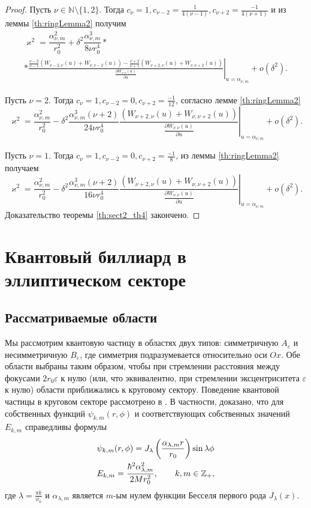 \begin{proof}
Пусть $\nu \in \mathbb{N} \setminus \{1, 2\}$. Тогда $c_\nu=1,
	c_{\nu-2} = \frac{1}{4(\nu-1)}, c_{\nu+2} = \frac{-1}{4(\nu+1)}$ и из леммы \ref{th:ringLemma2}  получим
\begin{multline*}
\varkappa^2 = \dfrac{\alpha_{\nu, m}^2}{r_0^2} + \delta^2 \dfrac{\alpha_{\nu, m}^3}{8 \nu r_0^4} * \\
 * \left. \frac{
\frac{\nu-2}{\nu-1}
\left(
W_{\nu-2, \nu}(u) + W_{\nu, \nu-2}(u)
\right)- 
\frac{\nu+2}{\nu+1}
\left(
W_{\nu+2, \nu}(u) + W_{\nu, \nu+2}(u)
\right)
}{ \frac{\partial W_{\nu,\nu}(u)}{\partial u} }\right|_{u=\alpha_{\nu, m}} + o(\delta^2).
\end{multline*}


Пусть $\nu = 2$. Тогда $c_\nu = 1, c_{\nu-2} = 0, c_{\nu+2} = \frac{-1}{12} $, согласно лемме \ref{th:ringLemma2} 
$$\varkappa^2 = \dfrac{\alpha_{\nu, m}^2}{r_0^2} - \delta^2 \dfrac{\alpha_{\nu, m}^3(\nu+2)}{24 \nu  r_0^4} \left. \frac{
	\left(
	W_{\nu+2, \nu}(u) + W_{\nu, \nu+2}(u)
	\right)
}{ \frac{\partial W_{\nu,\nu}(u)}{\partial u} }\right|_{u=\alpha_{\nu, m}} + o(\delta^2).$$

Пусть $\nu = 1$. Тогда $c_\nu = 1, c_{\nu-2} = 0, c_{\nu+2} = \frac{-1}{8}$, из леммы \ref{th:ringLemma2}  получаем
$$\varkappa^2 = \dfrac{\alpha_{\nu, m}^2}{r_0^2} - \delta^2 \dfrac{\alpha_{\nu, m}^3 (\nu+2)}{16 \nu r_0^4}
\left. \frac{
	\left(
	W_{\nu+2, \nu}(u) + W_{\nu, \nu+2}(u)
	\right)
}{ \frac{\partial W_{\nu,\nu}(u)}{\partial u} }\right|_{u=\alpha_{\nu, m}} + o(\delta^2).$$
Доказательство теоремы \ref{th:sect2_th4} закончено.
\end{proof}

\section{Квантовый биллиард в эллиптическом секторе}\label{sec:ch2/sec4}
\subsection{Рассматриваемые области}\label{sec:ch2/sec4/subs1}

Мы рассмотрим квантовую частицу в областях двух типов: симметричную $A_\varepsilon$ и несимметричную $B_\varepsilon$, где симметрия подразумевается относительно оси $Ox$.
Обе области выбраны таким образом, чтобы при стремлении расстояния между фокусами $2r_0 \varepsilon $ к нулю (или, что эквивалентно, при стремлении эксцентриситета $\varepsilon$ к нулю) области приближались к круговому сектору.
Поведение квантовой частицы в круговом секторе рассмотрено в \cite{wref13}.
В частности, доказано, что для собственных функций $\psi_{k,m}(r,\phi)$ и соответствующих собственных значений $E_{k,m}$ справедливы формулы
\begin{align}
&\psi_{k, m}(r, \phi) = J_\lambda\left(\frac{\alpha_{\lambda, m}r}{r_0}\right)\sin{\lambda\phi}\notag \\  
&E_{k,m} = \frac{\hbar^2 \alpha_{\lambda, m}^2}{2M r_0^2},
 \qquad k, m \in \mathbb{Z}_+, \label{eq:energy0}
\end{align}
где 
$\lambda = \frac{\pi k}{\phi_0}$ и $\alpha_{\lambda, m}$ является
$m$-ым нулем функции Бесселя первого рода $J_\lambda(x)$.

